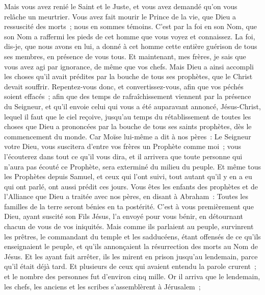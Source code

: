 \begin{multicols}{2}
Mais vous avez renié le Saint et le Juste, et vous avez demandé qu'on vous relâche un meurtrier.
Vous avez fait mourir le Prince de la vie, que Dieu a ressuscité des morts~; nous en sommes témoins.
C'est par la foi en son Nom, que son Nom a raffermi les pieds de cet homme que vous voyez et connaissez. La foi, dis-je, que nous avons en lui, a donné à cet homme cette entière guérison de tous ses membres, en présence de vous tous.
Et maintenant, mes frères, je sais que vous avez agi par ignorance, de même que vos chefs.
Mais Dieu a ainsi accompli les choses qu'il avait prédites par la bouche de tous ses prophètes, que le Christ devait souffrir.
Repentez-vous donc, et convertissez-vous, afin que vos péchés soient effacés~;
afin que des temps de rafraîchissement viennent par la présence du Seigneur, et qu'il envoie celui qui vous a été auparavant annoncé, Jésus-Christ,
lequel il faut que le ciel reçoive, jusqu'au temps du rétablissement de toutes les choses que Dieu a prononcées par la bouche de tous ses saints prophètes, dès le commencement du monde.
Car Moïse lui-même a dit à nos pères~: Le Seigneur votre Dieu, vous suscitera d'entre vos frères un Prophète comme moi~; vous l'écouterez dans tout ce qu'il vous dira,
et il arrivera que toute personne qui n'aura pas écouté ce Prophète, sera exterminé du milieu du peuple.
Et même tous les Prophètes depuis Samuel, et ceux qui l'ont suivi, tout autant qu'il y en a eu qui ont parlé, ont aussi prédit ces jours.
Vous êtes les enfants des prophètes et de l'Alliance que Dieu a traitée avec nos pères, en disant à Abraham~: Toutes les familles de la terre seront bénies en ta postérité.
C'est à vous premièrement que Dieu, ayant suscité son Fils Jésus, l'a envoyé pour vous bénir, en détournant chacun de vous de vos iniquités.
\VerseOne{}Mais comme ils parlaient au peuple, survinrent les prêtres, le commandant du temple et les sadducéens,
étant offensés de ce qu'ils enseignaient le peuple, et qu'ils annonçaient la résurrection des morts au Nom de Jésus.
Et les ayant fait arrêter, ils les mirent en prison jusqu'au lendemain, parce qu'il était déjà tard.
Et plusieurs de ceux qui avaient entendu la parole crurent~; et le nombre des personnes fut d'environ cinq mille.
Or il arriva que le lendemain, les chefs, les anciens et les scribes s'assemblèrent à Jérusalem~;

\end{multicols}
